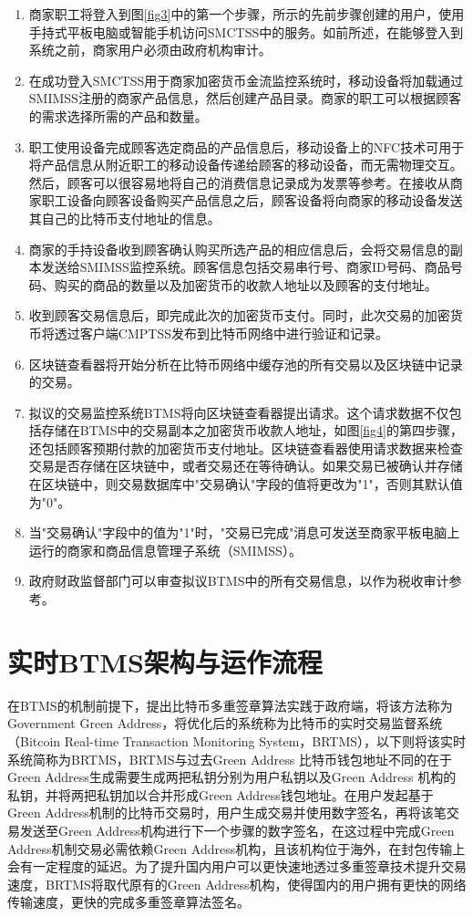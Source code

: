 		\begin{enumerate}
			\item 商家职工将登入到图\ref{fig3}中的第一个步骤，所示的先前步骤创建的用户，使用手持式平板电脑或智能手机访问SMCTSS中的服务。如前所述，在能够登入到系统之前，商家用户必须由政府机构审计。
			\item 在成功登入SMCTSS用于商家加密货币金流监控系统时，移动设备将加载通过SMIMSS注册的商家产品信息，然后创建产品目录。商家的职工可以根据顾客的需求选择所需的产品和数量。

			\item 职工使用设备完成顾客选定商品的产品信息后，移动设备上的NFC技术可用于将产品信息从附近职工的移动设备传递给顾客的移动设备，而无需物理交互。然后，顾客可以很容易地将自己的消费信息记录成为发票等参考。在接收从商家职工设备向顾客设备购买产品信息之后，顾客设备将向商家的移动设备发送其自己的比特币支付地址的信息。
			\item 商家的手持设备收到顾客确认购买所选产品的相应信息后，会将交易信息的副本发送给SMIMSS监控系统。顾客信息包括交易串行号、商家ID号码、商品号码、购买的商品的数量以及加密货币的收款人地址以及顾客的支付地址。
			\item 收到顾客交易信息后，即完成此次的加密货币支付。同时，此次交易的加密货币将透过客户端CMPTSS发布到比特币网络中进行验证和记录。
			\item 区块链查看器将开始分析在比特币网络中缓存池的所有交易以及区块链中记录的交易。
			\item 拟议的交易监控系统BTMS将向区块链查看器提出请求。这个请求数据不仅包括存储在BTMS中的交易副本之加密货币收款人地址，如图\ref{fig4}的第四步骤，还包括顾客预期付款的加密货币支付地址。区块链查看器使用请求数据来检查交易是否存储在区块链中，或者交易还在等待确认。如果交易已被确认并存储在区块链中，则交易数据库中"交易确认"字段的值将更改为"1"，否则其默认值为"0"。
			\item 当"交易确认"字段中的值为"1"时，"交易已完成"消息可发送至商家平板电脑上运行的商家和商品信息管理子系统（SMIMSS）。
			\item 政府财政监督部门可以审查拟议BTMS中的所有交易信息，以作为税收审计参考。
		\end{enumerate}

\section{实时BTMS架构与运作流程}

		在BTMS的机制前提下，提出比特币多重签章算法实践于政府端，将该方法称为Government Green Address，将优化后的系统称为比特币的实时交易监督系统（Bitcoin Real-time Transaction Monitoring System，BRTMS）\supercite{tanet}，以下则将该实时系统简称为BRTMS，BRTMS与过去Green Address 比特币钱包地址不同的在于Green Address生成需要生成两把私钥分别为用户私钥以及Green Address 机构的私钥，并将两把私钥加以合并形成Green Address钱包地址。在用户发起基于Green Address机制的比特币交易时，用户生成交易并使用数字签名，再将该笔交易发送至Green Address机构进行下一个步骤的数字签名，在这过程中完成Green Address机制交易必需依赖Green Address机构，且该机构位于海外，在封包传输上会有一定程度的延迟。为了提升国内用户可以更快速地透过多重签章技术提升交易速度，BRTMS将取代原有的Green Address机构，使得国内的用户拥有更快的网络传输速度，更快的完成多重签章算法签名。 

